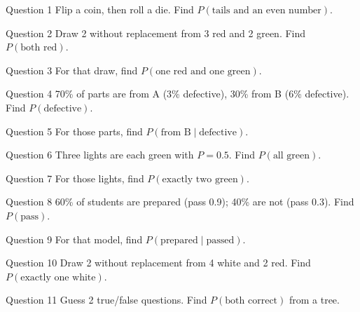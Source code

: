 \documentclass[11pt]{article}
\begin{document}
\begin{qbox}{Question 1}
Flip a coin, then roll a die. Find $P(\text{tails and an even number})$.\workspace{2.4cm}
\end{qbox}

\begin{qbox}{Question 2}
Draw 2 without replacement from 3 red and 2 green. Find $P(\text{both red})$.\workspace{2.4cm}
\end{qbox}

\begin{qbox}{Question 3}
For that draw, find $P(\text{one red and one green})$.\workspace{2.4cm}
\end{qbox}

\begin{qbox}{Question 4}
70\% of parts are from A (3\% defective), 30\% from B (6\% defective). Find $P(\text{defective})$.\workspace{2.4cm}
\end{qbox}

\begin{qbox}{Question 5}
For those parts, find $P(\text{from B}\mid\text{defective})$.\workspace{2.4cm}
\end{qbox}

\begin{qbox}{Question 6}
Three lights are each green with $P=0.5$. Find $P(\text{all green})$.\workspace{2.4cm}
\end{qbox}

\begin{qbox}{Question 7}
For those lights, find $P(\text{exactly two green})$.\workspace{2.4cm}
\end{qbox}

\begin{qbox}{Question 8}
60\% of students are prepared (pass 0.9); 40\% are not (pass 0.3). Find $P(\text{pass})$.\workspace{2.4cm}
\end{qbox}

\begin{qbox}{Question 9}
For that model, find $P(\text{prepared}\mid\text{passed})$.\workspace{2.4cm}
\end{qbox}

\begin{qbox}{Question 10}
Draw 2 without replacement from 4 white and 2 red. Find $P(\text{exactly one white})$.\workspace{2.4cm}
\end{qbox}

\begin{qbox}{Question 11}
Guess 2 true/false questions. Find $P(\text{both correct})$ from a tree.\workspace{2.4cm}
\end{qbox}
\end{document}
